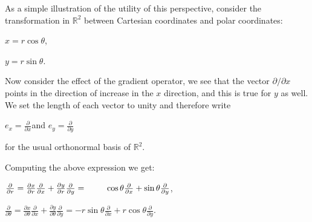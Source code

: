 \documentclass[12pt, a4paper]{article}
\begin{document}
\vspace{4mm}

\begin{flushleft}

    As a simple illustration of the utility of this perspective, consider the transformation in $\mathbb{R}^2$ between Cartesian coordinates and polar coordinates:\par
    
\vspace{4mm}

        \centerline{$x=r\cos{\theta}$,}
        
\vspace{2mm}

        \centerline{$y=r\sin{\theta}$.}
        
\vspace{4mm}

    Now consider the effect of the gradient operator, we see that the vector $\partial/\partial x$ points in the direction of increase in the $x$ direction, and this is true for $y$ as well. We set the length of each vector to unity and therefore write\par
    
\vspace{4mm}

        \centerline{$e_x=\frac{\partial}{\partial x}$\hspace{4mm}and\hspace{4mm} $e_y=\frac{\partial}{\partial y}$}
        
\vspace{4mm}

    for the usual orthonormal basis of $\mathbb{R}^2$.\par
    
\vspace{4mm}

    Computing the above expression we get:\par
    
\vspace{4mm}

        \centerline{$\frac{\partial}{\partial r}=\frac{\partial x}{\partial r}\frac{\partial}{\partial x}+\frac{\partial y}{\partial r}\frac{\partial}{\partial y}=\hspace{8.5mm}\cos\theta\frac{\partial}{\partial x}+\sin\theta\frac{\partial}{\partial y}$,}
        
\vspace{2mm}

        \centerline{$\frac{\partial}{\partial \theta}=\frac{\partial x}{\partial \theta}\frac{\partial}{\partial x}+\frac{\partial y}{\partial \theta}\frac{\partial}{\partial y}=-r\sin\theta\frac{\partial}{\partial x}+r\cos\theta\frac{\partial}{\partial y}$.}        
    
    
    
\end{flushleft}
\end{document}
